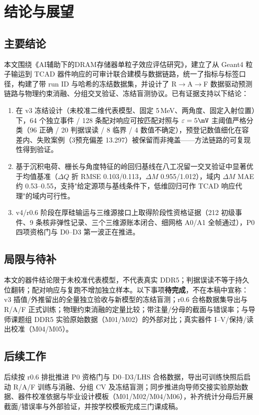 \section{结论与展望}

\subsection{主要结论}

本文围绕《AI辅助下的DRAM存储器单粒子效应评估研究》，建立了从 Geant4 粒子输运到 TCAD 器件响应的可审计联合建模与数据链路，统一了指标与标签口径，构建了带 run ID 与哈希的冻结数据集，并设计了 R$\rightarrow$A$\rightarrow$F 数据驱动预测链路与物理约束消融、分组交叉验证、冻结盲测协议。已有证据支持以下结论：

\begin{enumerate}
  \item 在 v3 冻结设计（未校准二维代表模型、固定 5\,MeV、两角度、固定入射位置）下，64 个独立事件 / 128 条配对响应可按匹配对照与 $\varepsilon=5\mV$ 主阈值严格分类（96 正确 / 20 判据误读 / 8 临界 / 4 数值不确定），预登记数值细化在容差内、失败案例（3\ns 预充偏差 13.297\uV）被保留而非掩盖——方法链路的可复现性得到验证。
  \item 基于沉积电荷、栅长与角度特征的岭回归基线在八工况留一交叉验证中显著优于均值基准（$\Delta Q$ 折 RMSE 0.103/0.113\fC，$\Delta M$ 0.955/1.012\mV），域内 $\Delta M$ MAE 约 0.53--0.55\mV，支持"给定源项与基线条件下，低维回归可作 TCAD 响应代理"的域内可行性。
  \item v4/r0.6 阶段在厚硅输运与三维源接口上取得阶段性资格证据（212 初级事件、9 条核非弹性记录、三个三维源账本闭合、细网格 A0/A1 全帧通过），P0 四项资格门与 D0--D3 第一波正在推进。
\end{enumerate}

\subsection{局限与待补}

本文的器件结论限于未校准代表模型，不代表真实 DDR5；判据误读不等于持久位翻转；配对响应与复跑不增加独立样本。以下事项\textbf{待完成}，不在本稿中宣称：v3 插值/外推留出的全量独立验收与新模型的冻结盲测；r0.6 合格数据集导出与 R/A/F 正式训练；物理约束消融的定量比较；带注量/分母的截面与错误率；与导师课题组 DDR5 实验原始数据（M01/M02）的外部对比；真实器件 I--V/保持/读出校准（M04/M05）。

\subsection{后续工作}

后续按 r0.6 排批推进 P0 资格门与 D0--D3/LHS 合格数据，导出可训练快照后启动 R/A/F 训练与消融、分组 CV 及冻结盲测；同步推进向导师交接实验原始数据、器件校准依据与毕业设计模板（M01/M02/M04/M06），补齐统计分母后开展截面/错误率与外部验证，并按学校模板完成三门课成稿。
